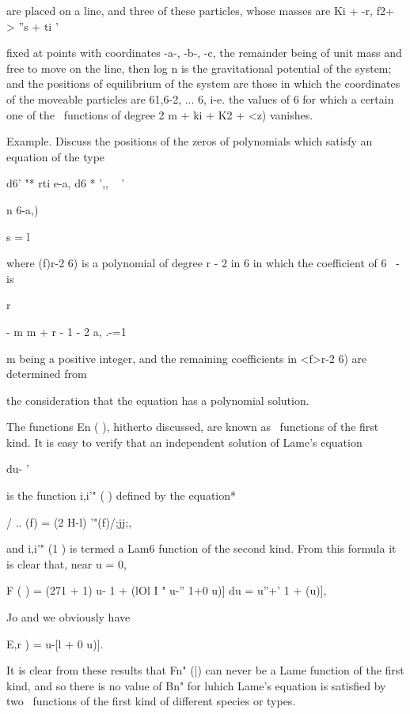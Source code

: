 {{{{{{{are placed on a line, and three of these particles, whose masses are
Ki + -r, f2+ > ''s + ti '

fixed at points with coordinates -a-, -b-, -c, the remainder being of
unit mass and free to move on the line, then log n is the
gravitational potential of the system; and the positions of
equilibrium of the system are those in which the coordinates of the
moveable particles are 61,6-2, ... 6, i-e. the values of 6 for which
a certain one of the \Lame\ functions of degree 2 m + ki + K2 + <z)
vanishes.

Example. Discuss the positions of the zeros of polynomials which
satisfy an equation of the type

d6' "* rti e-a, d6 * ',, ~ '

n 6-a,)

s = l

where (f)r-2 6) is a polynomial of degree r - 2 in 6 in which the
coefficient of 6 ~- is

r

- m m + r - 1 - 2 a, .-=1

m being a positive integer, and the remaining coefficients in <f>r-2
6) are determined from

the consideration that the equation has a polynomial solution.



The functions En ( ), hitherto discussed, are known as \Lame\ functions
of the first kind. It is easy to verify that an independent solution
of Lame's equation

du- '

is the function i,i'" ( ) defined by the equation*

/ .. (f) = (2 H-l) '"(f)/;jj;,

and i,i'" (1 ) is termed a Lam6 function of the second kind. From
this formula it is clear that, near u = 0,

F ( ) = (271 + 1) u- 1 + (lOl I " u-'' 1+0 u)] du = u''+' 1 + (u)],

Jo and we obviously have

E,r ) = u-[l + 0 u)].

It is clear from these results that Fn" (|) can never be a Lame
function of the first kind, and so there is no value of Bn" for luhich
Lame's equation is satisfied by two \Lame\ functions of the first kind
of different species or types.

}}}}}}}
